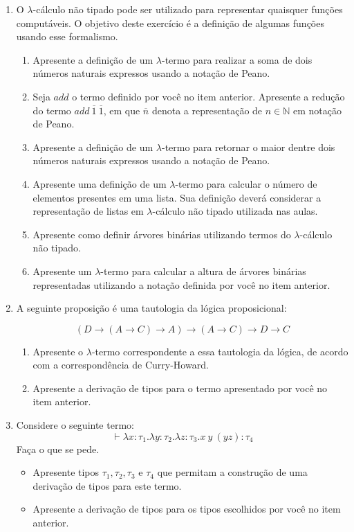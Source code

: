 \documentclass[a4paper]{article}
\theoremstyle{definition}
\begin{document}
  \begin{enumerate}

    \item O $\lambda$-cálculo não tipado pode ser utilizado para representar quaisquer funções computáveis.
          O objetivo deste exercício é a definição de algumas funções usando esse formalismo.
    \begin{enumerate}
      \item Apresente a definição de um $\lambda$-termo para realizar a soma de dois números naturais
            expressos usando a notação de Peano.
      \item Seja $add$ o termo definido por você no item anterior.
            Apresente a redução do termo $add\:\overline{1}\:\overline{1}$, em que $\overline{n}$ denota
            a representação de $n\in\mathbb{N}$ em notação de Peano.
      \item Apresente a definição de um $\lambda$-termo para retornar o maior dentre dois números naturais
            expressos usando a notação de Peano.
      \item Apresente uma definição de um $\lambda$-termo para calcular o número de elementos presentes em uma lista.
            Sua definição deverá considerar a representação de listas em $\lambda$-cálculo não tipado utilizada
            nas aulas.
      \item Apresente como definir árvores binárias utilizando termos do $\lambda$-cálculo não tipado.
      \item Apresente um $\lambda$-termo para calcular a altura de árvores binárias representadas utilizando a notação
            definida por você no item anterior.
    \end{enumerate}
    \item A seguinte proposição é uma tautologia da lógica proposicional:

          \[
          (D \to (A \to C) \to A) \to (A\to C) \to D \to C
          \]
          \begin{enumerate}
            \item Apresente o $\lambda$-termo correspondente a essa tautologia da lógica,
                  de acordo com a correspondência de Curry-Howard.
            \item Apresente a derivação de tipos para o termo apresentado por você no item anterior.
          \end{enumerate}
    \item Considere o seguinte termo:
          \[
          \vdash \lambda x : \tau_{1}. \lambda y : \tau_{2}.\lambda z : \tau_{3}. x\:y\:(y z) : \tau_{4}
          \]
          Faça o que se pede.
          \begin{itemize}
            \item Apresente tipos $\tau_{1},\tau_{2}, \tau_{3}$ e $\tau_{4}$ que permitam a construção de
                  uma derivação de tipos para este termo.
            \item Apresente a derivação de tipos para os tipos escolhidos por você no item anterior.
          \end{itemize}
  \end{enumerate}
\end{document}

